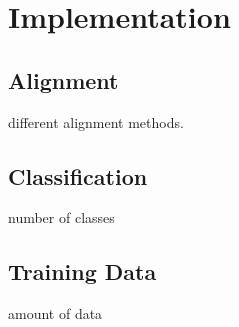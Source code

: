 \chapter{Implementation} %
\label{cha:implementation}
\section{Alignment} %
\label{sec:alignment}
different alignment methods.

\section{Classification} %
\label{sec:classification}
number of classes

\section{Training Data} %
\label{sec:training_data}
amount of data

